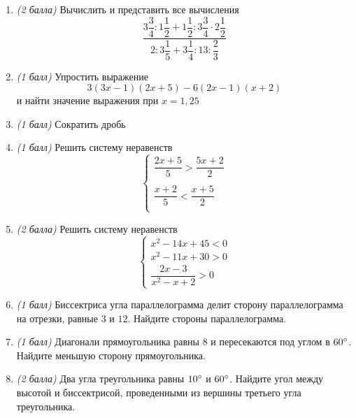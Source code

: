 \documentclass[12pt, a4paper]{article}
\begin{document}
	
	\begin{enumerate}
		\item \textit{(2 балла)} Вычислить и представить все вычисления $$\dfrac{3\dfrac{3}{4}:1\dfrac{1}{2}+1\dfrac{1}{2}:3\dfrac{3}{4}\cdot2\dfrac{1}{2}}{2:3\dfrac{1}{5}+3\dfrac{1}{4}:13:\dfrac{2}{3}}$$
		\item \textit{(1 балл)} Упростить выражение $$3(3x-1)(2x+5)-6(2x-1)(x+2)$$ и найти значение выражения при $x=1,25$
		\item \textit{(1 балл)} Сократить дробь
		\begin{enumerate}[label=\asbuk*)]
		\end{enumerate}
		\item \textit{(1 балл)} Решить систему неравенств 
		$$
		\left\{
		\begin{array}{l}
			\dfrac{2x+5}{5}>\dfrac{5x+2}{2}\\\\
			\dfrac{x+2}{5}<\dfrac{x+5}{2}\\
		\end{array}
		\right.
		$$
		\item \textit{(2 балла)} Решить систему неравенств 
		$$
		\left\{
		\begin{array}{l}
			x^2-14x+45 < 0\\
			x^2-11x+30 > 0\\
			\dfrac{2x-3}{x^2-x+2}>0
		\end{array}
		\right.
		$$
		\item \textit{(1 балл)} Биссектриса угла параллелограмма делит сторону параллелограмма на отрезки, равные $3$ и $12$. Найдите стороны параллелограмма.
		\item \textit{(1 балл)} Диагонали прямоугольника равны 8 и пересекаются под углом в $60\degree$. Найдите меньшую сторону прямоугольника.
		\item \textit{(2 балла)} Два угла треугольника равны $10\degree$ и $60\degree$. Найдите угол между высотой и биссектрисой, проведенными из вершины третьего угла треугольника.
	\end{enumerate}
\end{document}
